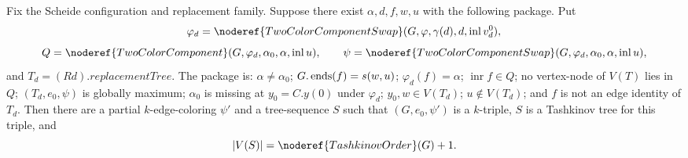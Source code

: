 \begin{helper}
Fix the Scheide configuration and replacement family.  Suppose there
exist $\alpha,d,f,w,u$ with the following package.  Put
\[
 \varphi_d=\noderef{TwoColorComponentSwap}
 (G,\varphi,\gamma(d),d,\operatorname{inl}v^0_d),
\]
\[
 Q=\noderef{TwoColorComponent}
 (G,\varphi_d,\alpha_0,\alpha,\operatorname{inl}u),\qquad
 \psi=\noderef{TwoColorComponentSwap}
 (G,\varphi_d,\alpha_0,\alpha,\operatorname{inl}u),
\]
and $T_d=(R d).\mathit{replacementTree}$.  The package is:
$\alpha\ne\alpha_0$; $G.\mathop{\rm ends}(f)=s(w,u)$;
$\varphi_d(f)=\alpha$; $\operatorname{inr}f\in Q$; no vertex-node of
$V(T)$ lies in $Q$; $(T_d,e_0,\psi)$ is globally maximum;
$\alpha_0$ is missing at $y_0=C.y(0)$ under $\varphi_d$;
$y_0,w\in V(T_d)$; $u\notin V(T_d)$; and $f$ is not an edge identity of
$T_d$.  Then there are a partial $k$-edge-coloring $\psi'$ and a
tree-sequence $S$ such that $(G,e_0,\psi')$ is a $k$-triple, $S$ is a
Tashkinov tree for this triple, and
\[
 |V(S)|=\noderef{TashkinovOrder}(G)+1.
\]
\end{helper}
